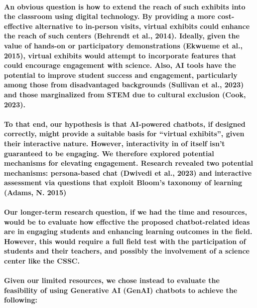 \documentclass{article}
\begin{document}
\paragraph{An obvious question is how to extend the reach of such exhibits into the classroom using digital technology. By providing a more cost-effective alternative to in-person visits, virtual exhibits could enhance the reach of such centers (Behrendt et al., 2014). Ideally, given the value of hands-on or participatory demonstrations (Ekwueme et al., 2015), virtual exhibits would attempt to incorporate features that could encourage engagement with science. Also, AI tools have the potential to improve student success and engagement, particularly among those from disadvantaged backgrounds (Sullivan et al., 2023) and those marginalized from STEM due to cultural exclusion (Cook, 2023).}

\paragraph{To that end, our hypothesis is that AI-powered chatbots, if designed correctly, might provide a suitable basis for “virtual exhibits”, given their interactive nature. However, interactivity in of itself isn’t guaranteed to be engaging. We therefore explored potential mechanisms for elevating engagement. Research revealed two potential mechanisms: persona-based chat (Dwivedi et al., 2023) and interactive assessment via questions that exploit Bloom’s taxonomy of learning (Adams, N. 2015)}

\paragraph{Our longer-term research question, if we had the time and resources, would be to evaluate how effective the proposed chatbot-related ideas are in engaging students and enhancing learning outcomes in the field. However, this would require a full field test with the participation of students and their teachers, and possibly the involvement of a science center like the CSSC. }

\paragraph{Given our limited resources, we chose instead to evaluate the feasibility of using Generative AI (GenAI) chatbots to achieve the following:}
\end{document}
